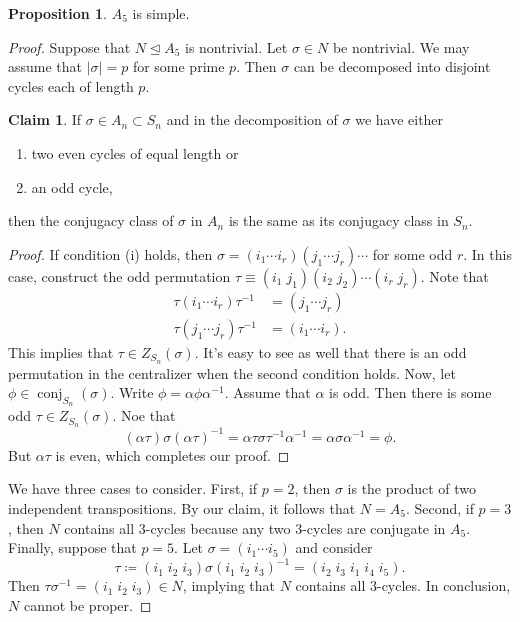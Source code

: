 \documentclass[10pt,letterpaper,cm]{nupset}
\theoremstyle{definition}
\theoremstyle{theorem}
\newtheorem{prop}[definition]{Proposition}
\newtheorem*{claim}{Claim}
\theoremstyle{remark}
\newcommand{\1}{\mathbf{1}}
\newcommand{\0}{\vec 0}
\DeclareMathOperator{\conj}{conj}
\begin{document}
\begin{prop}
$A_5$ is simple.
\end{prop}
\begin{proof}
Suppose that $N \unlhd A_5$ is nontrivial. Let $\sigma \in N$ be nontrivial. We may assume that $\lvert{\sigma}\rvert =p$ for some prime $p$. Then $\sigma$ can be decomposed into disjoint cycles each of length $p$.
\begin{claim}
If $\sigma \in A_n \subset S_n$ and in the decomposition of $\sigma$ we have either
\begin{enumerate}[label=(\roman*)]
\item two even cycles of equal length or
\item an odd cycle,
\end{enumerate}
then the conjugacy class of $\sigma$ in $A_n$ is the same as its conjugacy class in $S_n$.
\end{claim}
\begin{proof}
If condition (i) holds, then $\sigma = (i_1 \cdots i_r)(j_1 \cdots j_r)\cdots$ for some odd $r$. In this case,  construct the odd permutation $\tau \equiv (i_1 \; j_1)(i_2 \; j_2) \cdots (i_r \; j_r)$. Note that 
\begin{align*} 
\tau(i_1 \cdots i_r)\tau^{-1} &  = (j_1 \cdots j_r)  
\\ \tau (j_1 \cdots j_r) \tau^{-1} & = (i_1 \cdots i_r).
\end{align*} This implies that $\tau \in Z_{S_n}(\sigma)$. It's easy to see as well that there is an odd permutation in the centralizer when the second condition holds. Now, let $\phi \in \conj_{S_n}(\sigma)$. Write $\phi = \alpha \phi \alpha^{-1}$. Assume that $\alpha$ is odd. Then there is some odd $\tau \in Z_{S_n}(\sigma)$. Noe that $$(\alpha \tau) \sigma (\alpha \tau)^{-1} = \alpha \tau \sigma \tau^{-1} \alpha^{-1} = \alpha \sigma \alpha^{-1} = \phi.$$ But $\alpha \tau$ is even, which completes our proof.
\end{proof}
We have three cases to consider. First, if $p=2$, then $\sigma$ is the product of two independent transpositions. By our claim, it follows that $N = A_5$. Second, if $p=3$, then $N$ contains all $3$-cycles because any two $3$-cycles are conjugate in $A_5$. Finally, suppose that $p=5$. Let $\sigma = (i_1 \cdots i_5)$ and consider $$\tau \coloneqq (i_1 \; i_2\; i_3) \sigma (i_1 \; i_2\; i_3)^{-1} = (i_2 \; i_3 \; i_1 \; i_4 \; i_5).$$ Then $\tau \sigma^{-1} = (i_1 \; i_2 \; i_3) \in N$, implying that $N$ contains all $3$-cycles. In conclusion, $N$ cannot be proper.  
\end{proof}
\end{document}
